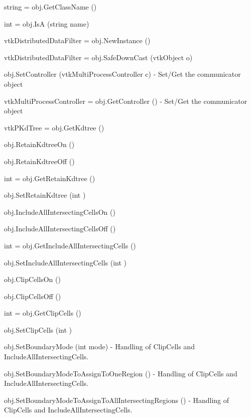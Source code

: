 \begin{DoxyItemize}
\item {\ttfamily string = obj.\-Get\-Class\-Name ()}  
\item {\ttfamily int = obj.\-Is\-A (string name)}  
\item {\ttfamily vtk\-Distributed\-Data\-Filter = obj.\-New\-Instance ()}  
\item {\ttfamily vtk\-Distributed\-Data\-Filter = obj.\-Safe\-Down\-Cast (vtk\-Object o)}  
\item {\ttfamily obj.\-Set\-Controller (vtk\-Multi\-Process\-Controller c)} -\/ Set/\-Get the communicator object  
\item {\ttfamily vtk\-Multi\-Process\-Controller = obj.\-Get\-Controller ()} -\/ Set/\-Get the communicator object  
\item {\ttfamily vtk\-P\-Kd\-Tree = obj.\-Get\-Kdtree ()}  
\item {\ttfamily obj.\-Retain\-Kdtree\-On ()}  
\item {\ttfamily obj.\-Retain\-Kdtree\-Off ()}  
\item {\ttfamily int = obj.\-Get\-Retain\-Kdtree ()}  
\item {\ttfamily obj.\-Set\-Retain\-Kdtree (int )}  
\item {\ttfamily obj.\-Include\-All\-Intersecting\-Cells\-On ()}  
\item {\ttfamily obj.\-Include\-All\-Intersecting\-Cells\-Off ()}  
\item {\ttfamily int = obj.\-Get\-Include\-All\-Intersecting\-Cells ()}  
\item {\ttfamily obj.\-Set\-Include\-All\-Intersecting\-Cells (int )}  
\item {\ttfamily obj.\-Clip\-Cells\-On ()}  
\item {\ttfamily obj.\-Clip\-Cells\-Off ()}  
\item {\ttfamily int = obj.\-Get\-Clip\-Cells ()}  
\item {\ttfamily obj.\-Set\-Clip\-Cells (int )}  
\item {\ttfamily obj.\-Set\-Boundary\-Mode (int mode)} -\/ Handling of Clip\-Cells and Include\-All\-Intersecting\-Cells.  
\item {\ttfamily obj.\-Set\-Boundary\-Mode\-To\-Assign\-To\-One\-Region ()} -\/ Handling of Clip\-Cells and Include\-All\-Intersecting\-Cells.  
\item {\ttfamily obj.\-Set\-Boundary\-Mode\-To\-Assign\-To\-All\-Intersecting\-Regions ()} -\/ Handling of Clip\-Cells and Include\-All\-Intersecting\-Cells.  

\end{DoxyItemize}
